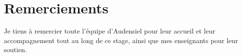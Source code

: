 \chapter*{Remerciements}

Je tiens à remercier toute l’équipe d’Audensiel pour leur accueil et leur accompagnement tout au long de ce stage, ainsi que mes enseignants pour leur soutien.
